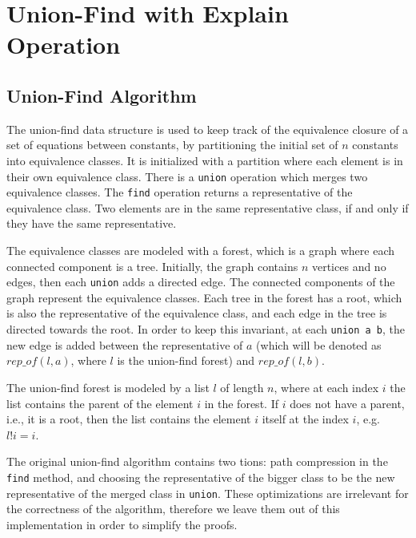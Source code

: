 
\chapter{Union-Find with Explain Operation}\label{chapter:union_find}

\section{Union-Find Algorithm}
\label{section:uf-algorithm}

The union-find data structure is used to keep track of the equivalence closure of a set of equations between constants,  by partitioning the initial set of $n$ constants into equivalence classes. It is initialized with a partition where each element is in their own equivalence class. There is a \lstinline{union} operation which merges two equivalence classes. The \lstinline{find} operation returns a representative of the equivalence class. Two elements are in the same representative class, if and only if they have the same representative.

The equivalence classes are modeled with a forest, which is a graph where each connected component is a tree. Initially, the graph contains $n$ vertices and no edges, then each \lstinline{union} adds a directed edge. The connected components of the graph represent the equivalence classes. Each tree in the forest has a root, which is also the representative of the equivalence class, and each edge in the tree is directed towards the root. In order to keep this invariant, at each \lstinline{union a b}, the new edge is added between the representative of $a$ (which will be denoted as $rep\_of(l, a)$, where $l$ is the union-find forest) and $rep\_of(l, b)$.

The union-find forest is modeled by a list $l$ of length $n$, where at each index $i$ the list contains the parent of the element $i$ in the forest. If $i$ does not have a parent, i.e., it is a root, then the list contains the element $i$ itself at the index $i$, e.g. $l!i = i$.

The original union-find algorithm \cite{Tarjan} contains two tions: path compression in the \lstinline{find} method, and choosing the representative of the bigger class to be the new representative of the merged class in \lstinline{union}. These optimizations are irrelevant for the correctness of the algorithm, therefore we leave them out of this implementation in order to simplify the proofs.


